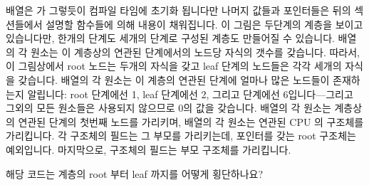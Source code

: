  배열은  가 그렇듯이 컴파일 타임에 초기화
됩니다만 나머지 값들과 포인터들은 뒤의 섹션들에서 설명할 함수들에 의해 내용이
채워집니다.
이 그림은 두단계의 계층을 보이고 있습니다만, 한개의 단계도 세개의 단계로 구성된
계층도 만들어질 수 있습니다.
 배열의 각 원소는 이 계층상의 연관된 단계에서의 노드당
자식의 갯수를 갖습니다.
따라서, 이 그림상에서 root 노드는 두개의 자식을 갖고 leaf 단계의 노드들은 각각
세개의 자식을 갖습니다.
 배열의 각 원소는 이 계층의 연관된 단계에 얼마나 많은 노드들이
존재하는지 알립니다: root 단계에선 1, leaf 단계에선 2, 그리고 
단계에선 6입니다---그리고 그외의 모든 원소들은 사용되지 않으므로 0의 값을
갖습니다.
 배열의 각 원소는  계층상의 연관된 단계의 첫번째
노드를 가리키며,  배열의 각 원소는 연관된 CPU 의 
구조체를 가리킵니다.
각  구조체의  필드는 그 부모를 가리키는데, 
 포인터를 갖는 root  구조체는 예외입니다.
마지막으로,  구조체의  필드는 부모 
구조체를 가리킵니다.
\iffalse

The \co{->levelcnt[]} array is initialized at compile time, as is
\co{->level[0]}, but the rest of the values and pointers are filled
in by the functions described in the following sections.
The figure shows a two-level hierarchy, but one-level and three-level
hierarchies are possible as well.
Each element of the \co{->levelspread[]} array gives the number of
children per node at the corresponding level of the hierarchy.
In the figure, therefore, the root node has two children and the
nodes at the leaf level each have three children.
Each element of the \co{levelcnt[]} array indicates how many nodes
there are on the corresponding level of the hierarchy: 1 at the root
level, 2 at the leaf level, and 6 at the \co{rcu_data} level---and any
extra elements are unused and left as zero.
Each element of the \co{->level[]} array references the first
node of the corresponding level of the \co{rcu_node} hierarchy,
and each element of the \co{->rda[]} array references the corresponding
CPU's \co{rcu_data} structure.
The \co{->parent} field of each \co{rcu_node} structure references
its parent, except for the root \co{rcu_node} structure, which
has a \co{NULL} \co{->parent} pointer.
Finally, the \co{->mynode} field of each \co{rcu_data} structure
references its parent \co{rcu_node} structure.
\fi

\QuickQuiz{}
	해당 코드는  계층의 root 부터 leaf 까지를 어떻게
	횡단하나요?
	\iffalse

